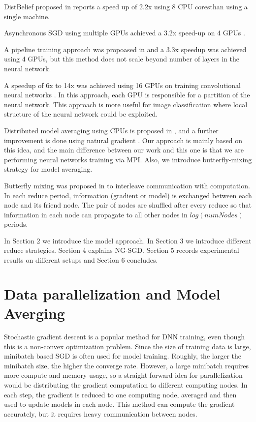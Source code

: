 \documentclass{article}
\begin{document}
DistBelief proposed in \cite{dean2012large} reports a speed up of 2.2x using 8 CPU coresthan using a
single machine.

Asynchronous SGD using multiple GPUs achieved a 3.2x speed-up on 4 GPUs \cite{zhang2013asynchronous}.

A pipeline training approach was propoased in \cite{chen2012pipelined} and a 3.3x speedup was achieved using 4 GPUs, but this
method does not scale beyond number of layers in the neural network.

A speedup of 6x to 14x was achieved using 16 GPUs on training convolutional neural networks \cite{coates2013deep}. In this approach,
each GPU is responsible for a partition of the neural network. This approach is more useful for image classification where 
local structure of the neural network could be exploited.

Distributed model averaging using CPUs is proposed in \cite{zhang2014improving}, and a further improvement 
is done using natural gradient \cite{povey2014parallel}. Our approach is mainly based on this idea, and the main 
difference between our work and this one is that we are performing neural networks training via MPI. Also,
we introduce butterfly-mixing strategy for model averaging.

Butterfly mixing was proposed in \cite{zhao2013butterfly} to interleave communication with computation. In each
reduce period, information (gradient or model) is exchanged between each node and its friend node. The pair of nodes
are shuffled after every reduce so that information in each node can propagate to all other nodes in 
$log(numNodes)$ periods.

In Section 2 we introduce the model approach. In Section 3 we introduce different reduce strategies. Section 4 
explains NG-SGD. Section 5 records experimental results on different setups and Section 6 concludes.

\section{Data parallelization and Model Averging}
Stochastic gradient descent is a popular method for DNN training, even though this is a non-convex optimization 
problem. Since the size of training data is large, minibatch based SGD is often used for model training. 
Roughly, the larger the minibatch size, the higher the converge rate. However, a large minibatch requires
more compute and memory usage, so a straight forward idea for parallelization would be distributing the 
gradient computation to different computing nodes. In each step, the gradient is reduced to one computing node,
averaged and then used to update models in each node. This method can compute the gradient accurately, but 
it requires heavy communication between nodes.
\end{document}
